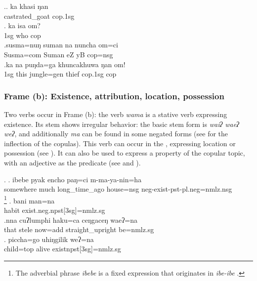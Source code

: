  \ex.\ag. ka khasi ŋan\\
	 castrated\_goat  {\sc cop.1sg} \\
	 
\bg. ka isa om?\\
{\sc 1sg} who {\sc cop}\\
\bg.susma=nuŋ    suman  na           nuncha           om=ci\\
Susma{\sc =com} Suman eZ yB {\sc cop=nsg}\\
 
\bg.ka  na   puŋda=ga    khuncakhuwa ŋan    om!\\
{\sc 1sg} this jungle{\sc =gen} thief  {\sc cop.1sg} {\sc cop}\\
 


\subsubsection{Frame (b): Existence, attribution, location, possession}

Two verbs occur in Frame (b): the verb  \emph{wama}   is a stative verb expressing existence.  Its stem shows irregular behavior: the basic stem form is \emph{waiʔ \ti waeʔ \ti weʔ}, and additionally \emph{ma} can be found in some negated forms (see  for the inflection of the copulas). This verb can occur in the , expressing location or possession (see \Next[a]). It can also be used to express a property of the copular topic, with an adjective as the predicate (see \Next[b] and \Next[c]).

	\ex. \ag. ibebe    pyak encho         paŋ=ci    m-ma-ya-nin=ha\\
somewhere much long\_time\_ago house{\sc =nsg} {\sc neg-}exist{\sc -pst-pl.neg=nmlz.nsg}\\
  \footnote{The adverbial phrase \emph{ibebe} is a fixed expression that originates in  \emph{ibe-ibe} .} 
  \bg. bani man=na\\
  habit exist{\sc .neg.npst[3sg]=nmlz.sg}		\\
	\bg.nna  cuʔlumphi haku=ca   ceŋgaceŋ       waeʔ=na\\
	that stele now{\sc =add} straight\_upright be{\sc [3sg;npst]=nmlz.sg}\\
 
\bg. piccha=go  uhiŋgilik weʔ=na\\ 
child{\sc=top} alive exist{\sc npst[3sg]=nmlz.sg}	\\ 
 	


